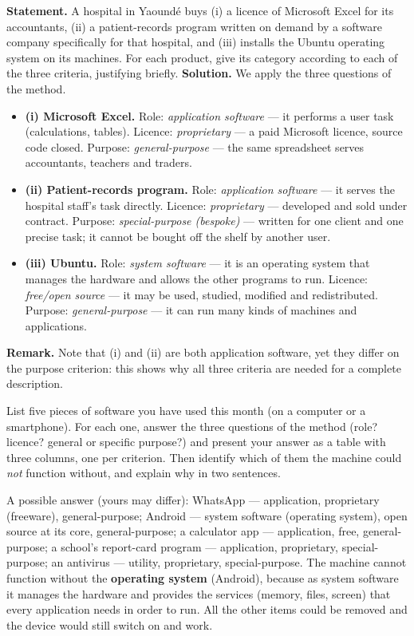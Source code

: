 \documentclass[11pt]{article}
\begin{document}
\begin{exoresolu}
\textbf{Statement.} A hospital in Yaoundé buys (i) a licence of Microsoft Excel for its accountants, (ii) a patient-records program written on demand by a software company specifically for that hospital, and (iii) installs the Ubuntu operating system on its machines. For each product, give its category according to each of the three criteria, justifying briefly.
\tcblower
\textbf{Solution.} We apply the three questions of the method.
\begin{itemize}
\item \textbf{(i) Microsoft Excel.} Role: \emph{application software} — it performs a user task (calculations, tables). Licence: \emph{proprietary} — a paid Microsoft licence, source code closed. Purpose: \emph{general-purpose} — the same spreadsheet serves accountants, teachers and traders.
\item \textbf{(ii) Patient-records program.} Role: \emph{application software} — it serves the hospital staff's task directly. Licence: \emph{proprietary} — developed and sold under contract. Purpose: \emph{special-purpose (bespoke)} — written for one client and one precise task; it cannot be bought off the shelf by another user.
\item \textbf{(iii) Ubuntu.} Role: \emph{system software} — it is an operating system that manages the hardware and allows the other programs to run. Licence: \emph{free/open source} — it may be used, studied, modified and redistributed. Purpose: \emph{general-purpose} — it can run many kinds of machines and applications.
\end{itemize}
\textbf{Remark.} Note that (i) and (ii) are both application software, yet they differ on the purpose criterion: this shows why all three criteria are needed for a complete description.
\end{exoresolu}

\begin{exercice}
List five pieces of software you have used this month (on a computer or a smartphone). For each one, answer the three questions of the method (role? licence? general or specific purpose?) and present your answer as a table with three columns, one per criterion. Then identify which of them the machine could \emph{not} function without, and explain why in two sentences.
\end{exercice}

\begin{corrige}[Exercise 1]
A possible answer (yours may differ): WhatsApp — application, proprietary (freeware), general-purpose; Android — system software (operating system), open source at its core, general-purpose; a calculator app — application, free, general-purpose; a school's report-card program — application, proprietary, special-purpose; an antivirus — utility, proprietary, special-purpose. The machine cannot function without the \textbf{operating system} (Android), because as system software it manages the hardware and provides the services (memory, files, screen) that every application needs in order to run. All the other items could be removed and the device would still switch on and work.
\end{corrige}
\end{document}
